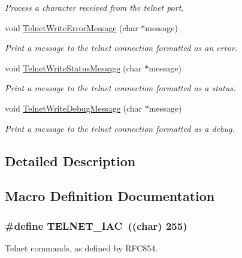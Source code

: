 \begin{DoxyCompactItemize}
\begin{DoxyCompactList}\small\item\em Process a character received from the telnet port. \end{DoxyCompactList}\item 
void \hyperlink{group__telnet__server_ga0660c325387baca6c54fe699ac048907}{Telnet\-Write\-Error\-Message} (char $\ast$message)
\begin{DoxyCompactList}\small\item\em Print a message to the telnet connection formatted as an error. \end{DoxyCompactList}\item 
void \hyperlink{group__telnet__server_ga0afb5de5ce2d81cdc5322e0534bae1d8}{Telnet\-Write\-Status\-Message} (char $\ast$message)
\begin{DoxyCompactList}\small\item\em Print a message to the telnet connection formatted as a status. \end{DoxyCompactList}\item 
void \hyperlink{group__telnet__server_ga7d350b6355ef213d4aa15e9b80c3d15e}{Telnet\-Write\-Debug\-Message} (char $\ast$message)
\begin{DoxyCompactList}\small\item\em Print a message to the telnet connection formatted as a debug. \end{DoxyCompactList}\end{DoxyCompactItemize}


\subsection{Detailed Description}


\subsection{Macro Definition Documentation}
\hypertarget{group__telnet__server_ga8b600918f84783490fd791ce773175ab}{
\subsubsection[{T\-E\-L\-N\-E\-T\-\_\-\-I\-A\-C}]{\setlength{\rightskip}{0pt plus 5cm}\#define T\-E\-L\-N\-E\-T\-\_\-\-I\-A\-C~((char) 255)}}\label{group__telnet__server_ga8b600918f84783490fd791ce773175ab}
Telnet commands, as defined by R\-F\-C854. 

